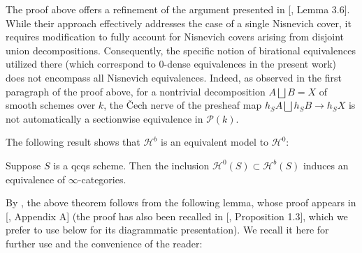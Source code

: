 \begin{rem}
    The proof above offers a refinement of the argument presented in [\cite{choudhury2022characterisation}, Lemma 3.6]. While their approach effectively addresses the case of a single Nisnevich cover, it requires modification to fully account for Nisnevich covers arising from disjoint union decompositions. Consequently, the specific notion of birational equivalences utilized there (which correspond to $0$-dense equivalences in the present work) does not encompass all Nisnevich equivalences. Indeed, as observed in the first paragraph of the proof above, for a nontrivial decomposition $A\bigsqcup B=X$ of smooth schemes over $k$, the \v{C}ech nerve of the presheaf map $h_SA\bigsqcup h_SB\to h_SX$ is not automatically a sectionwise equivalence in $\mathcal{P}(k)$.
\end{rem}
The following result shows that $\mathcal{H}^b$ is an equivalent model to $\mathcal{H}^0$:
\begin{cor}\label{Motivic equivalences are Birational equivalences}
Suppose $S$ is a qcqs scheme. Then the inclusion $\mathcal{H}^0(S)\subset \mathcal{H}^b(S)$ induces an equivalence of $\infty$-categories.
\end{cor}
By , the above theorem follows from the following lemma, whose proof appears in [\cite{MR3404383}, Appendix A] (the proof has also been recalled in [\cite{cisinski2023homotopy}, Proposition 1.3], which we prefer to use below for its diagrammatic presentation). We recall it here for further use and the convenience of the reader:
